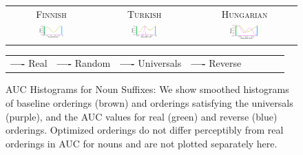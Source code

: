 \documentclass[man]{apa7}
\newcommand\mhahn[1]{{\color{red}(#1)}}
\begin{document}





\begin{figure}
\begin{center}
\begin{tabular}{ccc}
\textsc{Finnish} & \textsc{Turkish} & \textsc{Hungarian} \\
    \includegraphics[width=0.3\textwidth]{figures/finnish_nouns/suffixes-byMorphemes-auc-hist-heldout-Coarse-FineSurprisal-optimized.pdf}
    &
    \includegraphics[width=0.3\textwidth]{figures/turkish_nouns/suffixes-byMorphemes-auc-hist-heldout-Coarse-FineSurprisal-optimized.pdf}
    &
    \includegraphics[width=0.3\textwidth]{figures/hungarian_nouns/suffixes-byMorphemes-auc-hist-heldout-Coarse-FineSurprisal-optimized.pdf}
    \end{tabular}
    
    \begin{tabular}{llllllll}
\textbf{\textcolor{real}{----}} Real&
\textbf{\textcolor{random}{----}} Random&
\textbf{\textcolor{universals}{----}} Universals&
\textbf{\textcolor{reverse}{----}} Reverse
\end{tabular}
\end{center}
    
    \caption{AUC Histograms for Noun Suffixes: We show smoothed histograms of baseline orderings (brown) and orderings satisfying the universals (purple), and the AUC values for real (green) and reverse (blue) orderings. %
	Optimized orderings do not differ perceptibly from real orderings in AUC for nouns and are not plotted separately here.  }
    \label{fig:auc_nouns}
\end{figure}
\end{document}

